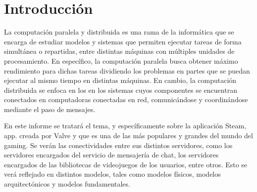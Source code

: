\chapter{Introducción}
\label{Introducción}

La computación paralela y distribuida es una rama de la informática que se encarga de estudiar modelos y sistemas que permiten ejecutar tareas de forma simultánea o repartidas, entre distintas máquinas con múltiples unidades de procesamiento.
En específico, la computación paralela busca obtener máximo rendimiento para dichas tareas dividiendo los problemas en partes que se puedan ejecutar al mismo tiempo en distintas máquinas.
En cambio, la computación distribuida se enfoca en los en los sistemas cuyos componentes se encuentran conectados en computadoras conectadas en red, comunicándose y coordinándose mediante el paso de mensajes.

En este informe se tratará el tema, y específicamente sobre la aplicación Steam, app. creada por Valve y que es una de las más populares y grandes del mundo del gaming. Se verán las conectividades entre sus distintos servidores, como los servidores encargados del servicio de mensajería de chat, los servidores encargados de las bibliotecas de videojuegos de los usuarios, entre otros. Esto se verá reflejado en distintos modelos, tales como modelos físicos, modelos arquitectónicos y modelos fundamentales.